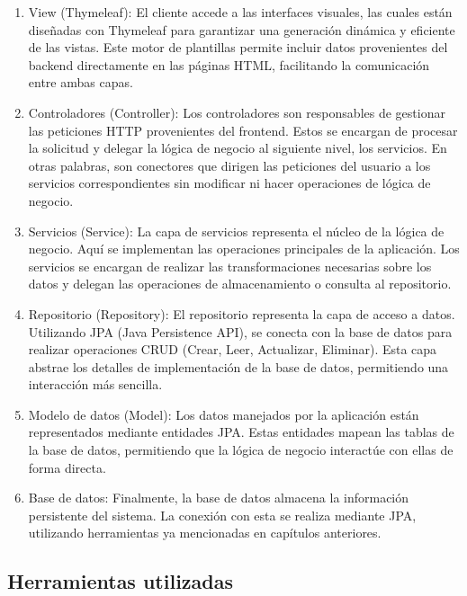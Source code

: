 \documentclass[draft]{scrbook}
\begin{document}
\begin{enumerate}
    \item View (Thymeleaf):
   El cliente accede a las interfaces visuales, las cuales están diseñadas con Thymeleaf para garantizar una generación dinámica y eficiente de las vistas. Este motor de plantillas permite incluir datos provenientes del backend directamente en las páginas HTML, facilitando la comunicación entre ambas capas.

    \item Controladores (Controller):
   Los controladores son responsables de gestionar las peticiones HTTP provenientes del frontend. Estos se encargan de procesar la solicitud y delegar la lógica de negocio al siguiente nivel, los servicios. En otras palabras, son conectores que dirigen las peticiones del usuario a los servicios correspondientes sin modificar ni hacer operaciones de lógica de negocio.

    \item Servicios (Service):
   La capa de servicios representa el núcleo de la lógica de negocio. Aquí se implementan las operaciones principales de la aplicación. Los servicios se encargan de realizar las transformaciones necesarias sobre los datos y delegan las operaciones de almacenamiento o consulta al repositorio.

    \item Repositorio (Repository):
   El repositorio representa la capa de acceso a datos. Utilizando JPA (Java Persistence API), se conecta con la base de datos para realizar operaciones CRUD (Crear, Leer, Actualizar, Eliminar). Esta capa abstrae los detalles de implementación de la base de datos, permitiendo una interacción más sencilla.

    \item Modelo de datos (Model):
   Los datos manejados por la aplicación están representados mediante entidades JPA. Estas entidades mapean las tablas de la base de datos, permitiendo que la lógica de negocio interactúe con ellas de forma directa.

    \item Base de datos:
   Finalmente, la base de datos almacena la información persistente del sistema. La conexión con esta se realiza mediante JPA, utilizando herramientas ya mencionadas en capítulos anteriores.
\end{enumerate}

\subsection{Herramientas utilizadas}
\end{document}
